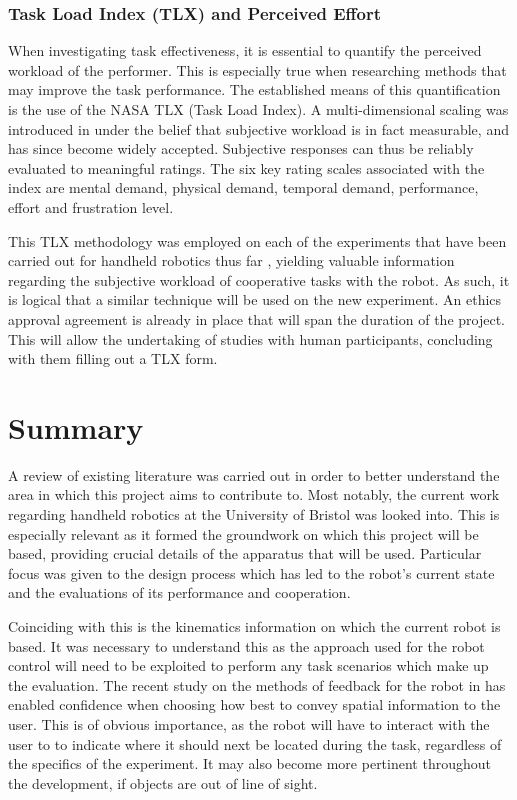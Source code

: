 \documentclass[11pt]{article}
\begin{document}
\subsubsection{Task Load Index (TLX) and Perceived Effort}

When investigating task effectiveness, it is essential to quantify the perceived workload of the performer. This is especially true when researching methods that may improve the task performance. The established means of this quantification is the use of the NASA TLX (Task Load Index). A multi-dimensional scaling was introduced in \cite{hart1988} under the belief that subjective workload is in fact measurable, and has since become widely accepted. Subjective responses can thus be reliably evaluated to meaningful ratings. The six key rating scales associated with the index are mental demand, physical demand, temporal demand, performance, effort and frustration level. 

This TLX methodology was employed on each of the experiments that have been carried out for handheld robotics thus far \cite{GreggSmithDesign} \cite{GreggSmithFeedback}, yielding valuable information regarding the subjective workload of cooperative tasks with the robot. As such, it is logical that a similar technique will be used on the new experiment. An ethics approval agreement is already in place that will span the duration of the project. This will allow the undertaking of studies with human participants, concluding with them filling out a TLX form. 
\pagebreak




\section{Summary}
A review of existing literature was carried out in order to better understand the area in which this project aims to contribute to. Most notably, the current work regarding handheld robotics at the University of Bristol was looked into. This is especially relevant as it formed the groundwork on which this project will be based,  providing crucial details of the apparatus that will be used. Particular focus was given to the design process which has led to the robot's current state and the evaluations of its performance and cooperation. 

Coinciding with this is the kinematics information on which the current robot is based. It was necessary to understand this as the approach used for the robot control will need to be exploited to perform any task scenarios which make up the evaluation. The recent study on the methods of feedback for the robot in \cite{GreggSmithFeedback} has enabled confidence when choosing how best to convey spatial information to the user. This is of obvious importance, as the robot will have to interact with the user to to indicate where it should next be located during the task, regardless of the specifics of the experiment. It may also become more pertinent throughout the development, if objects are out of line of sight.
\end{document}
